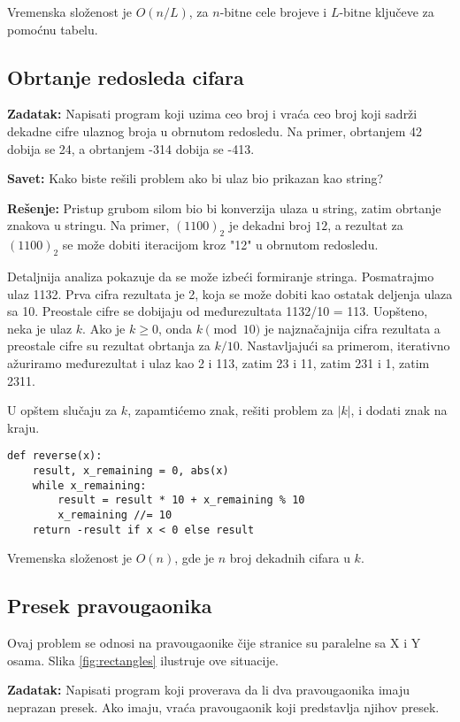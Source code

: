 \documentclass[11pt,a4paper]{article}
\begin{document}
Vremenska složenost je $O(n/L)$, za $n$-bitne cele brojeve i $L$-bitne ključeve
za pomoćnu tabelu.

\subsection{Obrtanje redosleda cifara}

\textbf{Zadatak:} Napisati program koji uzima ceo broj i vraća ceo broj koji
sadrži dekadne cifre ulaznog broja u obrnutom redosledu. Na primer, obrtanjem 42
dobija se 24, a obrtanjem -314 dobija se -413.

\textbf{Savet:} Kako biste rešili problem ako bi ulaz bio prikazan kao string?

\textbf{Rešenje:} Pristup grubom silom bio bi konverzija ulaza u string, zatim
obrtanje znakova u stringu. Na primer, $(1100)_2$ je dekadni broj $12$,
a rezultat za $(1100)_2$ se može dobiti iteracijom kroz "12" u obrnutom
redosledu.

Detaljnija analiza pokazuje da se može izbeći formiranje stringa. Posmatrajmo
ulaz 1132. Prva cifra rezultata je 2, koja se može dobiti kao ostatak deljenja
ulaza sa 10. Preostale cifre se dobijaju od međurezultata 1132/10 = 113.
Uopšteno, neka je ulaz $k$. Ako je $k \geq 0$, onda $k \pmod{10}$ je
najznačajnija cifra rezultata a preostale cifre su rezultat obrtanja za $k/10$.
Nastavljajući sa primerom, iterativno ažuriramo međurezultat i ulaz kao 2 i 113,
zatim 23 i 11, zatim 231 i 1, zatim 2311.

U opštem slučaju za $k$, zapamtićemo znak, rešiti problem za $|k|$, i dodati
znak na kraju.

\begin{verbatim}
def reverse(x):
    result, x_remaining = 0, abs(x)
    while x_remaining:
        result = result * 10 + x_remaining % 10
        x_remaining //= 10
    return -result if x < 0 else result
\end{verbatim}

Vremenska složenost je $O(n)$, gde je $n$ broj dekadnih cifara u $k$.

\subsection{Presek pravougaonika}

Ovaj problem se odnosi na pravougaonike čije stranice su paralelne sa X i Y
osama. Slika \ref{fig:rectangles} ilustruje ove situacije.

\textbf{Zadatak:} Napisati program koji proverava da li dva pravougaonika imaju
neprazan presek. Ako imaju, vraća pravougaonik koji predstavlja njihov presek. 
\end{document}
